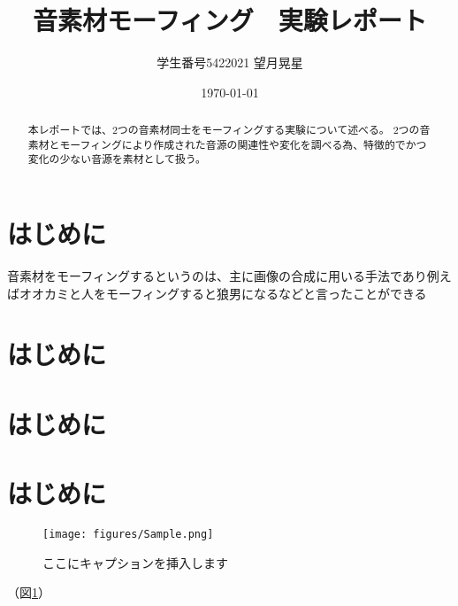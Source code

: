 \documentclass[platex,dvipdfmx]{jlreq}			%
\title{音素材モーフィング　実験レポート}
\author{学生番号5422021 望月晃星}
\date{\today}
\begin{document}
\maketitle

\begin{abstract}%
本レポートでは、2つの音素材同士をモーフィングする実験について述べる。
2つの音素材とモーフィングにより作成された音源の関連性や変化を調べる為、特徴的でかつ変化の少ない音源を素材として扱う。
\end{abstract}

\section{はじめに}
音素材をモーフィングするというのは、主に画像の合成に用いる手法であり例えばオオカミと人をモーフィングすると狼男になるなどと言ったことができる

\section{はじめに}
\section{はじめに}
\section{はじめに}

\begin{figure}
\centering
\texttt{[image: figures/Sample.png]}
\caption{ここにキャプションを挿入します}
\label{fig:model}
\end{figure}

（図\ref{fig:model}）
\end{document}
